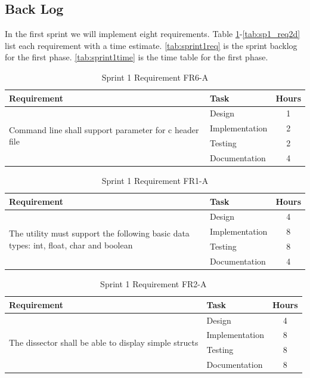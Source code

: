 \subsection{Back Log}
In the first sprint we will implement eight requirements. Table
\ref{tab:sp1_req7a}-\ref{tab:sp1_req2d}  list each requirement with a time
estimate. \autoref{tab:sprint1req} is the sprint backlog for the first phase.
\autoref{tab:sprint1time} is the time table for the first phase.

\begin{table}[!ht] \small \center
\caption{Sprint 1 Requirement FR6-A\label{tab:sp1_req7a}}
\begin{tabular}{l l c}
	\toprule
	Requirement & Task & Hours \\
	\midrule
	\multirow{4}{5cm}{Command line shall support parameter for \Gls{c} \gls{header} file} & Design & 1 \\
	& Implementation & 2 \\
	& Testing & 2 \\
	& Documentation & 4 \\
	\bottomrule
\end{tabular}
\end{table}

\begin{table}[!ht] \small \center
\caption{Sprint 1 Requirement FR1-A\label{tab:sp1_req1a}}
\begin{tabular}{l l c}
	\toprule
	Requirement & Task & Hours \\
	\midrule
	\multirow{4}{5cm}{The \gls{utility} must support the following basic data types: \gls{int}, \gls{float}, \gls{char} and \gls{boolean}} & Design & 4 \\
	& Implementation & 8 \\
	& Testing & 8 \\
	& Documentation & 4 \\
	\bottomrule
\end{tabular}
\end{table}

\begin{table}[!ht] \small \center
\caption{Sprint 1 Requirement FR2-A\label{tab:sp1_req2a}}
\begin{tabular}{l l c}
	\toprule
	Requirement & Task & Hours \\
	\midrule
	\multirow{4}{5cm}{The \gls{dissector} shall be able to display simple \glspl{struct}} & Design & 4 \\
	& Implementation & 8 \\
	& Testing & 8 \\
	& Documentation & 8 \\
	\bottomrule
\end{tabular}
\end{table}

